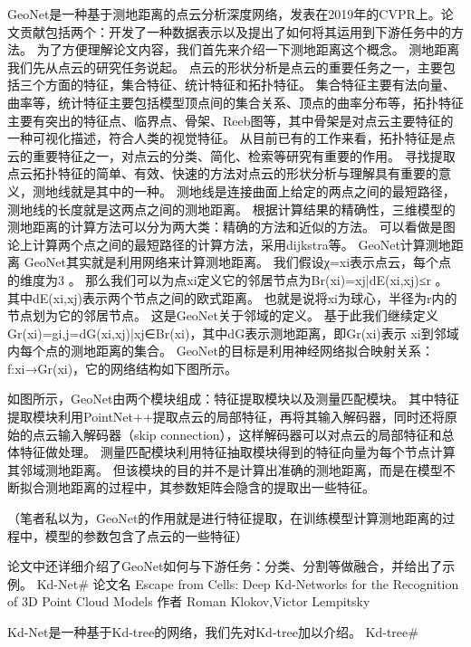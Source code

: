 \documentclass{amsart}
\begin{document}
    GeoNet是一种基于测地距离的点云分析深度网络，发表在2019年的CVPR上。论文贡献包括两个：开发了一种数据表示以及提出了如何将其运用到下游任务中的方法。
    为了方便理解论文内容，我们首先来介绍一下测地距离这个概念。
测地距离
我们先从点云的研究任务说起。
点云的形状分析是点云的重要任务之一，主要包括三个方面的特征，集合特征、统计特征和拓扑特征。
集合特征主要有法向量、曲率等，统计特征主要包括模型顶点间的集合关系、顶点的曲率分布等，拓扑特征主要有突出的特征点、临界点、骨架、Reeb图等，其中骨架是对点云主要特征的一种可视化描述，符合人类的视觉特征。
从目前已有的工作来看，拓扑特征是点云的重要特征之一，对点云的分类、简化、检索等研究有重要的作用。
寻找提取点云拓扑特征的简单、有效、快速的方法对点云的形状分析与理解具有重要的意义，测地线就是其中的一种。
测地线是连接曲面上给定的两点之间的最短路径，测地线的长度就是这两点之间的测地距离。
根据计算结果的精确性，三维模型的测地距离的计算方法可以分为两大类：精确的方法和近似的方法。
可以看做是图论上计算两个点之间的最短路径的计算方法，采用dijkstra等。
GeoNet计算测地距离
GeoNet其实就是利用网络来计算测地距离。
我们假设χ={xi}表示点云，每个点的维度为3 。
那么我们可以为点xi定义它的邻居节点为Br(xi)={xj|dE(xi,xj)≤r} 。
其中dE(xi,xj)表示两个节点之间的欧式距离。
也就是说将xi为球心，半径为r内的节点划为它的邻居节点。
这是GeoNet关于邻域的定义。
基于此我们继续定义Gr(xi)={gi,j=dG(xi,xj)|xj∈Br(xi)}，其中dG表示测地距离，即Gr(xi)表示 xi到邻域内每个点的测地距离的集合。
GeoNet的目标是利用神经网络拟合映射关系：f:xi→Gr(xi)，它的网络结构如下图所示。

如图所示，GeoNet由两个模块组成：特征提取模块以及测量匹配模块。
其中特征提取模块利用PointNet++提取点云的局部特征，再将其输入解码器，同时还将原始的点云输入解码器（skip connection），这样解码器可以对点云的局部特征和总体特征做处理。
测量匹配模块利用特征抽取模块得到的特征向量为每个节点计算其邻域测地距离。
但该模块的目的并不是计算出准确的测地距离，而是在模型不断拟合测地距离的过程中，其参数矩阵会隐含的提取出一些特征。

（笔者私以为，GeoNet的作用就是进行特征提取，在训练模型计算测地距离的过程中，模型的参数包含了点云的一些特征）

论文中还详细介绍了GeoNet如何与下游任务：分类、分割等做融合，并给出了示例。
Kd-Net#
    论文名 Escape from Cells: Deep Kd-Networks for the Recognition of 3D Point Cloud Models
    作者 Roman Klokov,Victor Lempitsky

Kd-Net是一种基于Kd-tree的网络，我们先对Kd-tree加以介绍。
Kd-tree#
\end{document}
